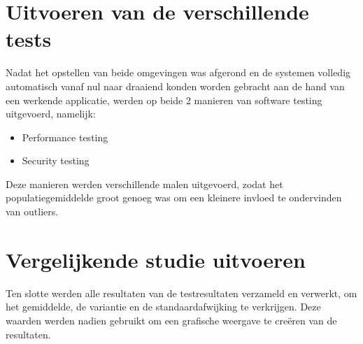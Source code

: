 \section{Uitvoeren van de verschillende tests}
Nadat het opstellen van beide omgevingen was afgerond en de systemen volledig automatisch vanaf nul naar draaiend konden worden gebracht aan de hand van een werkende applicatie, werden op beide 2 manieren van software testing uitgevoerd, namelijk:
\begin{itemize}[noitemsep]
	\item Performance testing
	\item Security testing
\end{itemize}
Deze manieren werden verschillende malen uitgevoerd, zodat het populatiegemiddelde groot genoeg was om een kleinere invloed te ondervinden van outliers.

\section{Vergelijkende studie uitvoeren}
Ten slotte werden alle resultaten van de testresultaten verzameld en verwerkt, om het gemiddelde, de variantie en de standaardafwijking te verkrijgen. Deze waarden werden nadien gebruikt om een grafische weergave te creëren van de resultaten.
